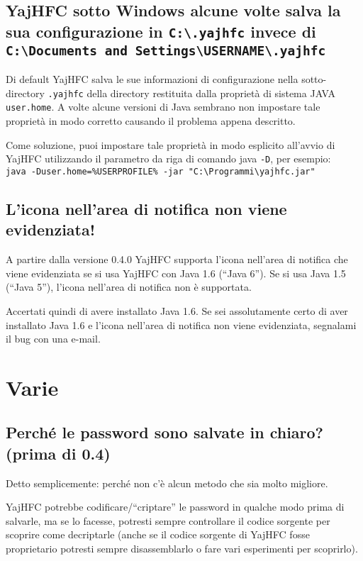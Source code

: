 \documentclass[a4paper,10pt]{scrartcl}
\begin{document}
\subsection{YajHFC sotto Windows alcune volte salva la sua configurazione in \texttt{C:\textbackslash .yajhfc} invece di \texttt{C:\textbackslash Documents and Settings\textbackslash USERNAME\textbackslash .yajhfc}}

Di default YajHFC salva le sue informazioni di configurazione nella sotto-directory \texttt{.yajhfc} della directory restituita dalla
proprietà di sistema JAVA \texttt{user.home}.
A volte alcune versioni di Java sembrano non impostare tale proprietà in modo corretto causando il problema appena descritto.

Come soluzione, puoi impostare tale proprietà in modo esplicito all'avvio di YajHFC utilizzando il parametro da riga di comando java \texttt{-D}, per esempio: \\
\texttt{java -Duser.home=\%USERPROFILE\% -jar "C:\textbackslash Programmi\textbackslash yajhfc.jar"}

\subsection{L'icona nell'area di notifica non viene evidenziata!}

A partire dalla versione 0.4.0 YajHFC supporta l'icona nell'area di notifica che viene evidenziata se si usa YajHFC con Java 1.6 (``Java 6'').
Se si usa Java 1.5 (``Java 5''), l'icona nell'area di notifica non è supportata.

Accertati quindi di avere installato Java 1.6. Se sei assolutamente certo di aver installato Java 1.6 e l'icona nell'area di notifica non viene evidenziata, segnalami il bug con una e-mail.


\section{Varie}

\subsection{Perché le password sono salvate in chiaro? (prima di 0.4)}

Detto semplicemente: perché non c'è alcun metodo che sia molto migliore.

YajHFC potrebbe codificare/``criptare'' le password in qualche modo prima di salvarle, ma se lo facesse, 
potresti sempre controllare il codice sorgente per scoprire come decriptarle
(anche se il codice sorgente di YajHFC fosse proprietario potresti sempre disassemblarlo
o fare vari esperimenti per scoprirlo).
\end{document}
